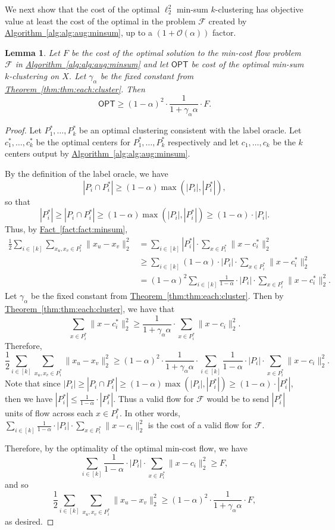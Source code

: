 \documentclass[10pt,a4paper]{amsart}
\newtheorem{lemma}[theorem]{Lemma}
\newcommand{\namedref}[2]{\hyperref[#2]{#1~\ref*{#2}}}
\newcommand{\thmref}[1]{\namedref{Theorem}{thm:#1}}
\newcommand{\lemlab}[1]{\label{lem:#1}}
\newcommand{\factref}[1]{\namedref{Fact}{fact:#1}}
\renewcommand{\algref}[1]{\namedref{Algorithm}{alg:#1}}
\def \OPT    {\mdef{\mathsf{OPT}}}
\renewcommand{\O}[1]{\ensuremath{\mathcal{O}\left(#1\right)}}
\def \calF    {\mdef{\mathcal{F}}}
\newcommand{\mdef}[1]{{\ensuremath{#1}}\xspace}  %
\begin{document}
We next show that the cost of the optimal $\ell_2^2$ min-sum $k$-clustering has objective value at least the cost of the optimal in the problem $\calF$ created by \algref{alg:aug:minsum}, up to a $(1+\O{\alpha})$ factor.   
\begin{lemma}
\lemlab{lem:flow:to:cost:two}
Let $F$ be the cost of the optimal solution to the min-cost flow problem $\calF$ in \algref{alg:aug:minsum} and let $\OPT$ be cost of the optimal min-sum $k$-clustering on $X$. 
Let $\gamma_\alpha$ be the fixed constant from \thmref{thm:each:cluster}. 
Then  
\[\OPT\ge(1-\alpha)^2\cdot\frac{1}{1+\gamma_\alpha\alpha}\cdot F.\]
\end{lemma}
\begin{proof}
Let $P^*_1,\ldots,P^*_k$ be an optimal clustering consistent with the label oracle. 
Let $c^*_1,\ldots,c^*_k$ be the optimal centers for $P^*_1,\ldots,P^*_k$ respectively and let $c_1,\ldots,c_k$ be the $k$ centers output by \algref{alg:aug:minsum}. 

By the definition of the label oracle, we have 
\[|P_i\cap P^*_i|\ge(1-\alpha)\max(|P_i|,|P^*_i|),\]
so that
\[|P^*_i|\ge|P_i\cap P^*_i|\ge(1-\alpha)\max(|P_i|,|P^*_i|)\ge(1-\alpha)\cdot|P_i|.\]
Thus, by \factref{fact:minsum}, 
\begin{align*}
\frac{1}{2}\sum_{i\in[k]}\sum_{x_u,x_v\in P^*_i}\|x_u-x_v\|_2^2&=\sum_{i\in[k]}|P^*_i|\cdot\sum_{x\in P^*_i}\|x-c^*_i\|_2^2\\
&\ge\sum_{i\in[k]}(1-\alpha)\cdot|P_i|\cdot\sum_{x\in P^*_i}\|x-c^*_i\|_2^2\\
&=(1-\alpha)^2\sum_{i\in[k]}\frac{1}{1-\alpha}\cdot|P_i|\cdot\sum_{x\in P^*_i}\|x-c^*_i\|_2^2.
\end{align*}
Let $\gamma_\alpha$ be the fixed constant from \thmref{thm:each:cluster}. 
Then by \thmref{thm:each:cluster}, we have that
\[\sum_{x\in P^*_i}\|x-c^*_i\|_2^2\ge\frac{1}{1+\gamma_\alpha\alpha}\cdot\sum_{x\in P^*_i}\|x-c_i\|_2^2.\]
Therefore,
\[\frac{1}{2}\sum_{i\in[k]}\sum_{x_u,x_v\in P^*_i}\|x_u-x_v\|_2^2\ge(1-\alpha)^2\cdot\frac{1}{1+\gamma_\alpha\alpha}\cdot\sum_{i\in[k]}\frac{1}{1-\alpha}\cdot|P_i|\cdot\sum_{x\in P^*_i}\|x-c_i\|_2^2.\]
Note that since $|P_i|\ge|P_i\cap P^*_i|\ge(1-\alpha)\max(|P_i|,|P^*_i|)\ge(1-\alpha)\cdot|P^*_i|$, then we have $|P^*_i|\le\frac{1}{1-\alpha}\cdot|P^*_i|$. 
Thus a valid flow for $\calF$ would be to send $|P^*_i|$ units of flow across each $x\in P^*_i$. 
In other words, $\sum_{i\in[k]}\frac{1}{1-\alpha}\cdot|P_i|\cdot\sum_{x\in P^*_i}\|x-c_i\|_2^2$ is the cost of a valid flow for $\calF$. 

Therefore, by the optimality of the optimal min-cost flow, we have 
\[\sum_{i\in[k]}\frac{1}{1-\alpha}\cdot|P_i|\cdot\sum_{x\in P^*_i}\|x-c_i\|_2^2\ge F,\]
and so
\[\frac{1}{2}\sum_{i\in[k]}\sum_{x_u,x_v\in P^*_i}\|x_u-x_v\|_2^2\ge(1-\alpha)^2\cdot\frac{1}{1+\gamma_\alpha\alpha}\cdot F,\]
as desired.
\end{proof}
\end{document}
